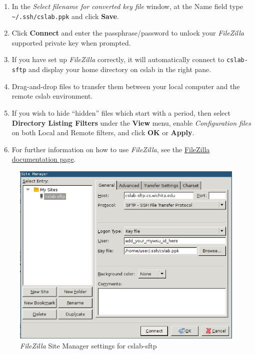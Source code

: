 \documentclass[12pt]{article}
\begin{document}
\begin{flushleft}
\begin{enumerate}
  \item In the \textit{Select filename for converted key file} window, at the Name field type \verb|~/.ssh/cslab.ppk| and click \textbf{Save}.
  \item Click \textbf{Connect} and enter the passphrase/password to unlock your \textit{FileZilla} supported private key when prompted.
  \item If you have set up \textit{FileZilla} correctly, it will automatically connect to \verb|cslab-sftp| and display your home directory on cslab in the right pane.
  \item Drag-and-drop files to transfer them between your local computer and the remote cslab environment.
  \item If you wish to hide ``hidden'' files which start with a period, then select \textbf{Directory Listing Filters} under the \textbf{View} menu, enable \textit{Configuration files} on both Local and Remote filters, and click \textbf{OK} or \textbf{Apply}.
  \item For further information on how to use \textit{FileZilla}, see the \href{https://wiki.filezilla-project.org/Documentation}{FileZilla documentation page}.
\end{enumerate}

\begin{figure}[bh!]
  \centering
  \centering
  \includegraphics[width=.6\linewidth]{filezilla_cslab_site_manager}
\caption{\textit{FileZilla} Site Manager settings for cslab-sftp}
  \label{fig:pageant}
\end{figure}


\end{flushleft}
\end{document}

